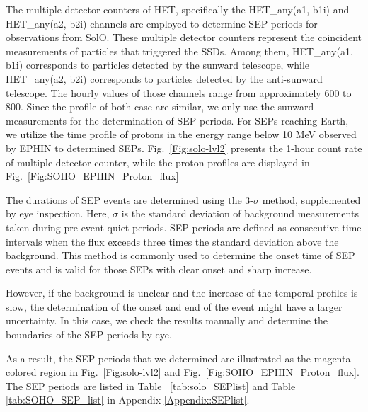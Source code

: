 The multiple detector counters of \ac{HET}, specifically the HET\_any(a1, b1i) and HET\_any(a2, b2i) channels are employed to determine \ac{SEP} periods for observations from \ac{SolO}. 
These multiple detector counters represent the coincident measurements of particles that triggered the \acp{SSD}. Among them, HET\_any(a1, b1i) corresponds to particles detected by the sunward telescope, while HET\_any(a2, b2i) corresponds to particles detected by the anti-sunward telescope. The hourly values of those channels range from approximately 600 to 800. Since the profile of both case are similar, we only use the sunward measurements for the determination of \ac{SEP} periods. 
For \acp{SEP} reaching Earth, we utilize the time profile of protons in the energy range below 10 MeV observed by \ac{EPHIN} to determined \acp{SEP}. 
Fig.~\ref{Fig:solo-lvl2} presents the 1-hour count rate of multiple detector counter, while the proton profiles are displayed in Fig.~\ref{Fig:SOHO_EPHIN_Proton_flux}

The durations of \ac{SEP} events are determined using the 3-$\sigma$ method, supplemented by eye inspection. Here, $\sigma$ is the standard deviation of background measurements taken during pre-event quiet periods. \ac{SEP} periods are defined as consecutive time intervals when the flux exceeds three times the standard deviation above the background. This method is commonly used to determine the onset time of \ac{SEP} events and is valid for those \acp{SEP} with clear onset and sharp increase.

However, if the background is unclear and the increase of the temporal profiles is slow, the determination of the onset and end of the event might have a larger uncertainty. In this case, we check the results manually and determine the boundaries of the \ac{SEP} periods by eye.

As a result, the \ac{SEP} periods that we determined are illustrated as the magenta-colored region in Fig.~\ref{Fig:solo-lvl2} and Fig.~\ref{Fig:SOHO_EPHIN_Proton_flux}. The \ac{SEP} periods are listed in Table ~\ref{tab:solo_SEPlist} and Table \ref{tab:SOHO_SEP_list} in Appendix \ref{Appendix:SEPlist}.





